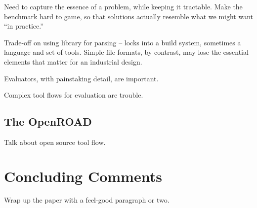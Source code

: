 \documentclass[sigconf]{acmart}
\begin{document}
Need to capture the essence of a problem, while keeping it
tractable.  Make the benchmark hard to game, so that solutions
actually resemble what we might want ``in practice.''

Trade-off on using library for parsing -- locks into a build
system, sometimes a language and set of tools.  Simple
file formats, by contrast, may lose the essential elements
that matter for an industrial design.

Evaluators, with painstaking detail, are important.

Complex tool flows for evaluation are trouble.







\subsection{The OpenROAD}

Talk about open source tool flow.  

\cite{Ajayi19}




\section{Concluding Comments}

Wrap up the paper with a feel-good paragraph or two.


\balance


\end{document}
